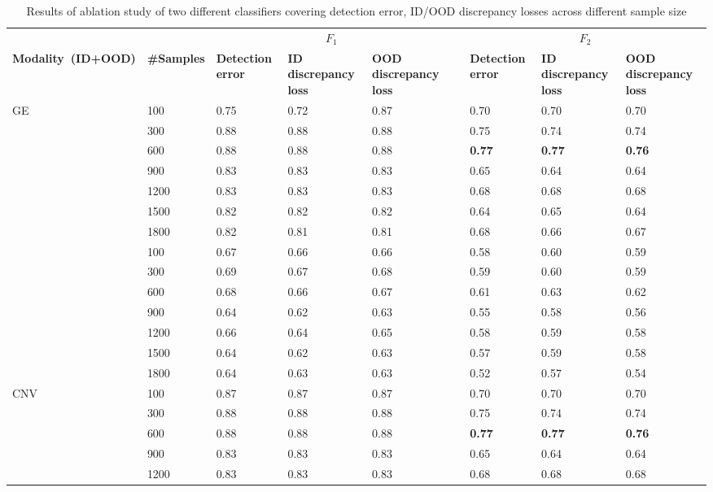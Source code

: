 \iffalse
\begin{table}
	\centering
	\caption{Results of ablation study of two different classifiers covering detection error, ID/OOD discrepancy losses across different sample size} 
	\scriptsize{
	\begin{tabular}{lllllllll}
		& & \multicolumn{3}{c}{\bfseries{$F_1$}} && \multicolumn{3}{c}{\bfseries{$F_2$}} \\	
		\cmidrule{3-5}\cmidrule{7-9}   
		\textbf{Modality~(ID+OOD)}&\textbf{\#Samples}& \textbf{Detection error} & \textbf{ID discrepancy loss}& \textbf{OOD discrepancy loss} 
		&& \textbf{Detection error} & \textbf{ID discrepancy loss}& \textbf{OOD discrepancy loss}\\
		\hline
		\multirow{8}{*}{{GE}} & 100 & 0.75 & 0.72 & 0.87 && 0.70 & 0.70 & 0.70\\
		& 300 & 0.88 & 0.88 & 0.88  && 0.75 & 0.74 & 0.74 \\
    	& 600 & 0.88 & 0.88 & 0.88 && \textbf{0.77} & \textbf{0.77} & \textbf{0.76} \\
		& 900 & 0.83 & 0.83 & 0.83 && 0.65 & 0.64 & 0.64\\
		& 1200 & 0.83 & 0.83 & 0.83 && 0.68 & 0.68 & 0.68\\
		& 1500 & 0.82 & 0.82 & 0.82 && 0.64 & 0.65 & 0.64\\
		& 1800 & 0.82 & 0.81 & 0.81 && 0.68 & 0.66 & 0.67\\
		\hline
		\multirow{8}{*}{{MR}} & 100 & 0.67 & 0.66 & 0.66 && 0.58 & 0.60 & 0.59\\
		& 300 & 0.69 & 0.67 & 0.68 && 0.59 & 0.60 & 0.59\\
		& 600 & 0.68 & 0.66 & 0.67 && 0.61 & 0.63 & 0.62\\
		& 900 & 0.64 & 0.62 & 0.63 && 0.55 & 0.58 & 0.56\\
		& 1200 & 0.66 & 0.64 & 0.65 && 0.58 & 0.59 & 0.58\\
		& 1500 & 0.64 & 0.62 & 0.63 && 0.57 & 0.59 & 0.58\\
		& 1800 & 0.64 & 0.63 & 0.63 && 0.52 & 0.57 & 0.54\\
		\hline
		\multirow{8}{*}{{CNV}} & 100 & 0.87 & 0.87 & 0.87 && 0.70 & 0.70 & 0.70\\
		& 300 & 0.88 & 0.88 & 0.88  && 0.75 & 0.74 & 0.74 \\
    	& 600 & 0.88 & 0.88 & 0.88 && \textbf{0.77} & \textbf{0.77} & \textbf{0.76} \\
		& 900 & 0.83 & 0.83 & 0.83 && 0.65 & 0.64 & 0.64\\
		& 1200 & 0.83 & 0.83 & 0.83 && 0.68 & 0.68 & 0.68\\

\end{tabular}}
\end{table}
